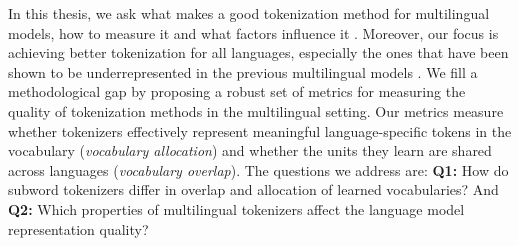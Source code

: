 

In this thesis, we ask what makes a good tokenization method for multilingual models, how to measure it and what factors influence it . Moreover, our focus is achieving better tokenization for all languages, especially the ones that have been shown to be underrepresented in the previous multilingual models \cite{rust_how_2021}. We fill a methodological gap by proposing a robust set of metrics for measuring the quality of tokenization methods in the multilingual setting. Our metrics measure whether tokenizers effectively represent meaningful language-specific tokens in the vocabulary (\textit{vocabulary allocation}) and whether the units they learn are shared across languages (\textit{vocabulary overlap}). The questions we address are: \textbf{Q1:} How do subword tokenizers differ in overlap and allocation of learned vocabularies? And \textbf{Q2:} Which properties of multilingual tokenizers affect the language model representation quality?

